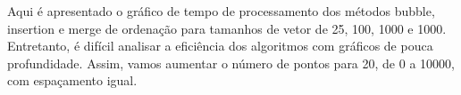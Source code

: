 \documentclass[preview]{standalone}
\begin{document}
\begin{center}
Aqui é apresentado o gráfico de tempo de processamento dos métodos bubble, insertion e merge de ordenação para tamanhos de vetor de 25, 100, 1000 e 1000. Entretanto, é difícil analisar a eficiência dos algoritmos com gráficos de pouca profundidade. Assim, vamos aumentar o número de pontos para 20, de 0 a 10000, com espaçamento igual.
\end{center}
\end{document}
